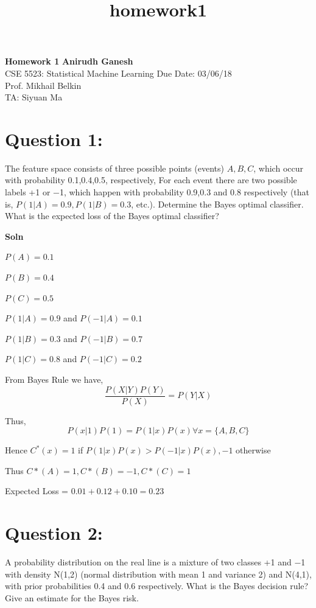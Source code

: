 \documentclass[11pt]{article}
\title{homework1}
\begin{document}
    
    
\noindent
\large\textbf{Homework 1} \hfill \textbf{Anirudh Ganesh} \\
\normalsize CSE 5523: Statistical Machine Learning \hfill Due Date: 03/06/18 \\
Prof. Mikhail Belkin \\
TA: Siyuan Ma 
    
    

    
    \hypertarget{question-1}{%
\section{Question 1:}\label{question-1}}

The feature space consists of three possible points (events) \(A,B,C\),
which occur with probability 0.1,0.4,0.5, respectively, For each event
there are two possible labels +1 or −1, which happen with probability
0.9,0.3 and 0.8 respectively (that is, \(P(1|A) = 0.9,P(1|B) = 0.3\),
etc.). Determine the Bayes optimal classifier. What is the expected loss
of the Bayes optimal classifier?


\textbf{Soln}

\(P(A) = 0.1\)

\(P(B) = 0.4\)

\(P(C) = 0.5\)

\(P(1 | A) = 0.9\) and \(P(-1|A)=0.1\)

\(P(1 | B) = 0.3\) and \(P(-1|B)=0.7\)

\(P(1 | C) = 0.8\) and \(P(-1|C)=0.2\)

From Bayes Rule we have, \[\frac{P(X|Y)P(Y)}{P(X)} = P(Y|X)\]

Thus, \[P(x|1)P(1) = P(1|x)P(x) \forall x = \{A, B, C\}\]

Hence \(C^*(x) = 1\) if \(P(1|x)P(x) > P(-1|x)P(x), -1\) otherwise

Thus \(C*(A) = 1, C*(B) = -1, C*(C) = 1\)

Expected Loss = \(0.01 + 0.12 + 0.10 = 0.23\)

\clearpage

    \hypertarget{question-2}{%
\section{Question 2:}\label{question-2}}

A probability distribution on the real line is a mixture of two classes
+1 and −1 with density N(1,2) (normal distribution with mean 1 and
variance 2) and N(4,1), with prior probabilities 0.4 and 0.6
respectively. What is the Bayes decision rule? Give an estimate for the
Bayes risk.
\end{document}
